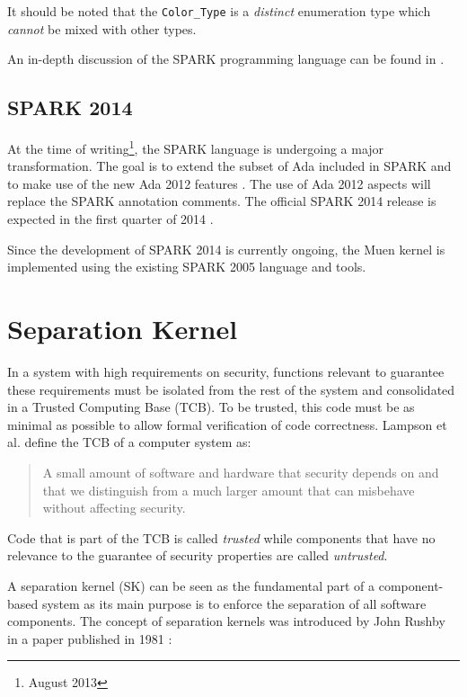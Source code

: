 It should be noted that the \texttt{Color\_Type} is a \emph{distinct}
enumeration type which \emph{cannot} be mixed with other types.

An in-depth discussion of the SPARK programming language can be found in
\cite{BarnesSPARK}.

\subsection{SPARK 2014}
At the time of writing\footnote{August 2013}, the SPARK language is undergoing
a major transformation. The goal is to extend the subset of Ada included in
SPARK and to make use of the new Ada 2012 features \cite{Ada2012}. The use of
Ada 2012 aspects will replace the SPARK annotation comments. The official SPARK
2014 release is expected in the first quarter of 2014
\cite{SPARK2014:Announcement}.

Since the development of SPARK 2014 is currently ongoing, the Muen kernel is
implemented using the existing SPARK 2005 language and tools.




\section{Separation Kernel}
In a system with high requirements on security, functions relevant
to guarantee these requirements must be isolated from the rest of
the system and consolidated in a Trusted Computing Base (TCB).
To be trusted, this code must be as minimal as possible to allow formal
verification of code correctness. Lampson et al.
\cite{Lampson:1991:ADS:121133.121160} define the TCB of a computer system as:
\begin{quote}
	A small amount of software and hardware that security depends on and
	that we distinguish from a much larger amount that can misbehave without
	affecting security.
\end{quote}

Code that is part of the TCB is called \emph{trusted} while components that have
no relevance to the guarantee of security properties are called
\emph{untrusted}.

A separation kernel (SK) can be seen as the fundamental
part of a component-based system as its main purpose is to enforce the
separation of all software components. The concept of separation kernels was
introduced by John Rushby in a paper published in 1981 \cite{rushby1981}:

